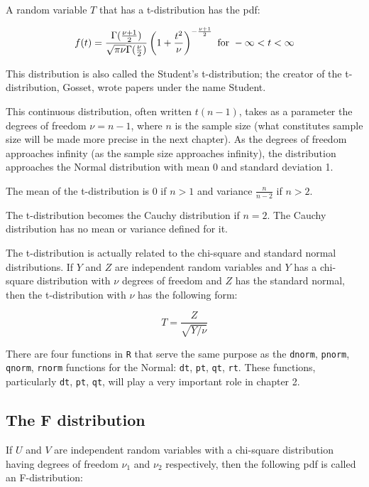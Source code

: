 \documentclass[
  12pt,
]{krantz}
\theoremstyle{definition}
\theoremstyle{definition}
\theoremstyle{definition}
\theoremstyle{definition}
\theoremstyle{remark}
\begin{document}
A random variable \(T\) that has a t-distribution has the pdf:

\begin{equation}
f(t) = \frac{\Gamma(\frac{\nu+1}{2})}{\sqrt{\pi\nu}\Gamma(\frac{\nu}{2})}\left(1+\frac{t^2}{\nu}\right)^{-\frac{\nu + 1}{2}} \hbox{ for } -\infty < t < \infty
\end{equation}

This distribution is also called the Student's t-distribution; the creator of the t-distribution, Gosset, wrote papers under the name Student.

This continuous distribution, often written \(t(n-1)\), takes as a parameter the degrees of freedom \(\nu=n-1\), where \(n\) is the sample size (what constitutes sample size will be made more precise in the next chapter). As the degrees of freedom approaches infinity (as the sample size approaches infinity), the distribution approaches the Normal distribution with mean 0 and standard deviation 1.

The mean of the t-distribution is \(0\) if \(n>1\) and variance \(\frac{n}{n-2}\) if \(n>2\).

The t-distribution becomes the Cauchy distribution if \(n=2\). The Cauchy distribution has no mean or variance defined for it.

The t-distribution is actually related to the chi-square and standard normal distributions.
If \(Y\) and \(Z\) are independent random variables and \(Y\) has a chi-square distribution with \(\nu\) degrees of freedom and \(Z\) has the standard normal, then the t-distribution with \(\nu\) has the following form:

\begin{equation}
T = \frac{Z}{\sqrt{Y/\nu}}
\end{equation}

There are four functions in \texttt{R} that serve the same purpose as the \texttt{dnorm}, \texttt{pnorm}, \texttt{qnorm}, \texttt{rnorm} functions for the Normal:
\texttt{dt}, \texttt{pt}, \texttt{qt}, \texttt{rt}. These functions, particularly \texttt{dt}, \texttt{pt}, \texttt{qt}, will play a very important role in chapter 2.

\hypertarget{the-f-distribution}{%
\subsection{The F distribution}\label{the-f-distribution}}

If \(U\) and \(V\) are independent random variables with a chi-square distribution having degrees of freedom \(\nu_1\) and \(\nu_2\) respectively, then the following pdf is called an F-distribution:
\end{document}
